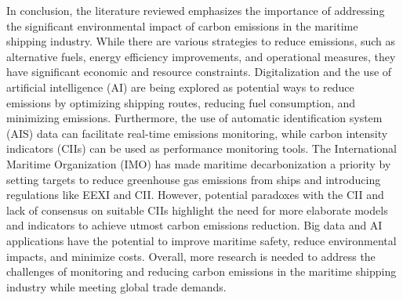 In conclusion, the literature reviewed emphasizes the importance of addressing the significant environmental impact of carbon emissions in the maritime shipping industry.
While there are various strategies to reduce emissions, such as alternative fuels, energy efficiency improvements, and operational measures, they have significant economic and resource constraints.
Digitalization and the use of artificial intelligence (AI) are being explored as potential ways to reduce emissions by optimizing shipping routes, reducing fuel consumption, and minimizing emissions.
Furthermore, the use of automatic identification system (AIS) data can facilitate real-time emissions monitoring, while carbon intensity indicators (CIIs) can be used as performance monitoring tools.
The International Maritime Organization (IMO) has made maritime decarbonization a priority by setting targets to reduce greenhouse gas emissions from ships and introducing regulations like EEXI and CII.
However, potential paradoxes with the CII and lack of consensus on suitable CIIs highlight the need for more elaborate models and indicators to achieve utmost carbon emissions reduction. Big data and AI applications have the potential to improve maritime safety, reduce environmental impacts, and minimize costs.
Overall, more research is needed to address the challenges of monitoring and reducing carbon emissions in the maritime shipping industry while meeting global trade demands.

